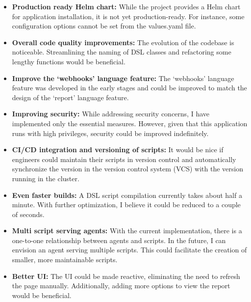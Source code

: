 \begin{itemize}
\item \textbf{Production ready Helm chart:} While the project provides a Helm chart for application installation, it is not yet production-ready. For instance, some configuration options cannot be set from the values.yaml file.

\item \textbf{Overall code quality improvements:} The evolution of the codebase is noticeable. Streamlining the naming of DSL classes and refactoring some lengthy functions would be beneficial.

\item \textbf{Improve the `webhooks' language feature:} The `webhooks' language feature was developed in the early stages and could be improved to match the design of the `report' language feature.

\item \textbf{Improving security:} While addressing security concerns, I have implemented only the essential measures. However, given that this application runs with high privileges, security could be improved indefinitely. 

\item \textbf{CI/CD integration and versioning of scripts:} It would be nice if engineers could maintain their scripts in version control and automatically synchronize the version in the version control system (VCS) with the version running in the cluster.

\item \textbf{Even faster builds:} A DSL script compilation currently takes about half a minute. With further optimization, I believe it could be reduced to a couple of seconds.

\item \textbf{Multi script serving agents:} With the current implementation, there is a one-to-one relationship between agents and scripts. In the future, I can envision an agent serving multiple scripts. This could facilitate the creation of smaller, more maintainable scripts.

\item \textbf{Better UI:} The UI could be made reactive, eliminating the need to refresh the page manually. Additionally, adding more options to view the report would be beneficial.
\end{itemize}
